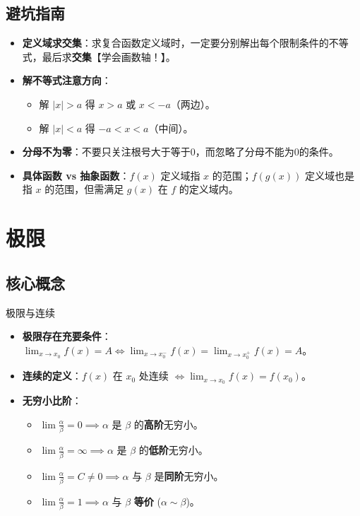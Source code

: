 \documentclass[UTF8, a4paper, 10pt]{ctexart} %
\newenvironment{pitfall}{
    \begin{tcolorbox}[
        colback=yellow!10, 
        colframe=orange!80!black, 
        title=避坑指南, 
        fonttitle=\bfseries\small, 
        arc=1mm,
        left=2pt, right=2pt, top=2pt, bottom=2pt,
        toptitle=1pt, bottomtitle=1pt
    ]
    \begin{itemize}[leftmargin=*, nosep, label=\textcolor{red}{\textbf{!}}]
}{
    \end{itemize}
    \end{tcolorbox}
}
\begin{document}
\subsection{避坑指南}
\begin{pitfall}
    \item \textbf{定义域求交集}：求复合函数定义域时，一定要分别解出每个限制条件的不等式，最后求\textbf{交集}【学会画数轴！】。
    \item \textbf{解不等式注意方向}：
    \begin{itemize}[nosep]
        \item 解 $|x| > a$ 得 $x > a$ 或 $x < -a$（两边）。
        \item 解 $|x| < a$ 得 $-a < x < a$（中间）。
    \end{itemize}
    \item \textbf{分母不为零}：不要只关注根号大于等于0，而忽略了分母不能为0的条件。
    \item \textbf{具体函数 vs 抽象函数}：$f(x)$ 定义域指 $x$ 的范围；$f(g(x))$ 定义域也是指 $x$ 的范围，但需满足 $g(x)$ 在 $f$ 的定义域内。
\end{pitfall}

\section{极限}

\subsection{核心概念}
\begin{concept}{极限与连续}
    \begin{itemize}[nosep]
        \item \textbf{极限存在充要条件}：$\lim_{x \to x_0} f(x) = A \iff \lim_{x \to x_0^-} f(x) = \lim_{x \to x_0^+} f(x) = A$。
        \item \textbf{连续的定义}：$f(x)$ 在 $x_0$ 处连续 $\iff \lim_{x \to x_0} f(x) = f(x_0)$。
        \item \textbf{无穷小比阶}：
        \begin{itemize}[nosep]
            \item $\lim \frac{\alpha}{\beta} = 0 \implies \alpha$ 是 $\beta$ 的\textbf{高阶}无穷小。
            \item $\lim \frac{\alpha}{\beta} = \infty \implies \alpha$ 是 $\beta$ 的\textbf{低阶}无穷小。
            \item $\lim \frac{\alpha}{\beta} = C \neq 0 \implies \alpha$ 与 $\beta$ 是\textbf{同阶}无穷小。
            \item $\lim \frac{\alpha}{\beta} = 1 \implies \alpha$ 与 $\beta$ \textbf{等价} ($\alpha \sim \beta$)。
        \end{itemize}
    \end{itemize}
\end{concept}
\end{document}
